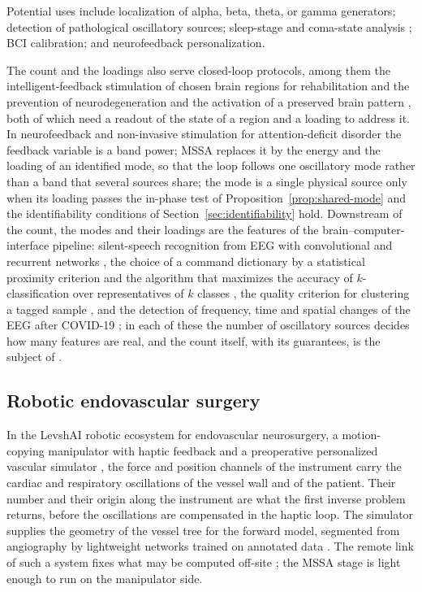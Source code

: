 \documentclass{article}
\begin{document}
Potential uses include localization of alpha, beta, theta, or gamma generators; detection of pathological oscillatory sources; sleep-stage and coma-state analysis \cite{ref-Bernadotte07}; BCI calibration; and neurofeedback personalization.

The count and the loadings also serve closed-loop protocols, among them the intelligent-feedback stimulation of chosen brain regions for rehabilitation and the prevention of neurodegeneration \cite{pat-feedback} and the activation of a preserved brain pattern \cite{pat-pattern}, both of which need a readout of the state of a region and a loading to address it. In neurofeedback and non-invasive stimulation for attention-deficit disorder \cite{ref-ADHD} the feedback variable is a band power; MSSA replaces it by the energy and the loading of an identified mode, so that the loop follows one oscillatory mode rather than a band that several sources share; the mode is a single physical source only when its loading passes the in-phase test of Proposition~\ref{prop:shared-mode} and the identifiability conditions of Section~\ref{sec:identifiability} hold. Downstream of the count, the modes and their loadings are the features of the brain--computer-interface pipeline: silent-speech recognition from EEG with convolutional and recurrent networks \cite{ref-Sensors}, the choice of a command dictionary by a statistical proximity criterion \cite{ref-CRMdict} and the algorithm that maximizes the accuracy of $k$-classification over representatives of $k$ classes \cite{ref-MathK, ref-DMA}, the quality criterion for clustering a tagged sample \cite{ref-ISCluster}, and the detection of frequency, time and spatial changes of the EEG after COVID-19 \cite{ref-CRMcovid, ref-ISCovid}; in each of these the number of oscillatory sources decides how many features are real, and the count itself, with its guarantees, is the subject of \cite{ref-companionA}.

\subsection{Robotic endovascular surgery}\label{sec:robotic-endovascular}

In the LevshAI robotic ecosystem for endovascular neurosurgery, a motion-copying manipulator with haptic feedback and a preoperative personalized vascular simulator \cite{ref-LevshAI-CBS, ref-LevshAI-sim}, the force and position channels of the instrument carry the cardiac and respiratory oscillations of the vessel wall and of the patient. Their number and their origin along the instrument are what the first inverse problem returns, before the oscillations are compensated in the haptic loop. The simulator supplies the geometry of the vessel tree for the forward model, segmented from angiography by lightweight networks \cite{ref-VeNet} trained on annotated data \cite{ref-SciData}. The remote link of such a system fixes what may be computed off-site \cite{ref-Cyber}; the MSSA stage is light enough to run on the manipulator side.
\end{document}
